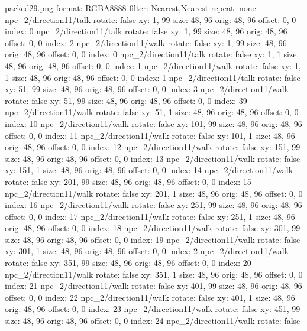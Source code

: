 packed29.png
format: RGBA8888
filter: Nearest,Nearest
repeat: none
npc_2/direction11/talk
  rotate: false
  xy: 1, 99
  size: 48, 96
  orig: 48, 96
  offset: 0, 0
  index: 0
npc_2/direction11/talk
  rotate: false
  xy: 1, 99
  size: 48, 96
  orig: 48, 96
  offset: 0, 0
  index: 2
npc_2/direction11/walk
  rotate: false
  xy: 1, 99
  size: 48, 96
  orig: 48, 96
  offset: 0, 0
  index: 0
npc_2/direction11/talk
  rotate: false
  xy: 1, 1
  size: 48, 96
  orig: 48, 96
  offset: 0, 0
  index: 1
npc_2/direction11/walk
  rotate: false
  xy: 1, 1
  size: 48, 96
  orig: 48, 96
  offset: 0, 0
  index: 1
npc_2/direction11/talk
  rotate: false
  xy: 51, 99
  size: 48, 96
  orig: 48, 96
  offset: 0, 0
  index: 3
npc_2/direction11/walk
  rotate: false
  xy: 51, 99
  size: 48, 96
  orig: 48, 96
  offset: 0, 0
  index: 39
npc_2/direction11/walk
  rotate: false
  xy: 51, 1
  size: 48, 96
  orig: 48, 96
  offset: 0, 0
  index: 10
npc_2/direction11/walk
  rotate: false
  xy: 101, 99
  size: 48, 96
  orig: 48, 96
  offset: 0, 0
  index: 11
npc_2/direction11/walk
  rotate: false
  xy: 101, 1
  size: 48, 96
  orig: 48, 96
  offset: 0, 0
  index: 12
npc_2/direction11/walk
  rotate: false
  xy: 151, 99
  size: 48, 96
  orig: 48, 96
  offset: 0, 0
  index: 13
npc_2/direction11/walk
  rotate: false
  xy: 151, 1
  size: 48, 96
  orig: 48, 96
  offset: 0, 0
  index: 14
npc_2/direction11/walk
  rotate: false
  xy: 201, 99
  size: 48, 96
  orig: 48, 96
  offset: 0, 0
  index: 15
npc_2/direction11/walk
  rotate: false
  xy: 201, 1
  size: 48, 96
  orig: 48, 96
  offset: 0, 0
  index: 16
npc_2/direction11/walk
  rotate: false
  xy: 251, 99
  size: 48, 96
  orig: 48, 96
  offset: 0, 0
  index: 17
npc_2/direction11/walk
  rotate: false
  xy: 251, 1
  size: 48, 96
  orig: 48, 96
  offset: 0, 0
  index: 18
npc_2/direction11/walk
  rotate: false
  xy: 301, 99
  size: 48, 96
  orig: 48, 96
  offset: 0, 0
  index: 19
npc_2/direction11/walk
  rotate: false
  xy: 301, 1
  size: 48, 96
  orig: 48, 96
  offset: 0, 0
  index: 2
npc_2/direction11/walk
  rotate: false
  xy: 351, 99
  size: 48, 96
  orig: 48, 96
  offset: 0, 0
  index: 20
npc_2/direction11/walk
  rotate: false
  xy: 351, 1
  size: 48, 96
  orig: 48, 96
  offset: 0, 0
  index: 21
npc_2/direction11/walk
  rotate: false
  xy: 401, 99
  size: 48, 96
  orig: 48, 96
  offset: 0, 0
  index: 22
npc_2/direction11/walk
  rotate: false
  xy: 401, 1
  size: 48, 96
  orig: 48, 96
  offset: 0, 0
  index: 23
npc_2/direction11/walk
  rotate: false
  xy: 451, 99
  size: 48, 96
  orig: 48, 96
  offset: 0, 0
  index: 24
npc_2/direction11/walk
  rotate: false

